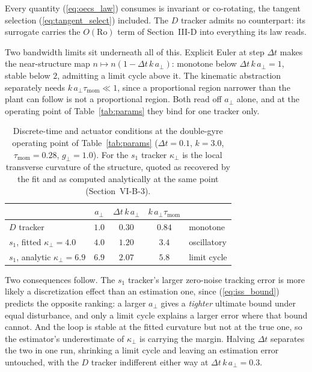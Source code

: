 \documentclass[lettersize,journal]{IEEEtran}
\begin{document}
Every quantity (\ref{eq:oecs_law}) consumes is invariant or co-rotating,
the tangent selection (\ref{eq:tangent_select}) included. The $D$
tracker admits no counterpart: its surrogate carries the
$O(\mathrm{Ro})$ term of Section~\mbox{III-D} into everything its law
reads.

Two bandwidth limits sit underneath all of this. Explicit Euler at step
$\Delta t$ makes the near-structure map $n \mapsto n(1 - \Delta t\,k\,
a_\perp)$: monotone below $\Delta t\,k\,a_\perp = 1$, stable below $2$,
admitting a limit cycle above it. The kinematic abstraction separately
needs $k\,a_\perp\tau_{\mathrm{mom}} \ll 1$, since a proportional region
narrower than the plant can follow is not a proportional region. Both
read off $a_\perp$ alone, and at the operating point of
Table~\ref{tab:params} they bind for one tracker only.

\begin{table}[!t]
\centering
\caption{Discrete-time and actuator conditions at the double-gyre
operating point of Table~\ref{tab:params} ($\Delta t = 0.1$, $k = 3.0$,
$\tau_{\mathrm{mom}} = 0.28$, $g_\perp = 1.0$). For the $s_1$ tracker
$\kappa_\perp$ is the local transverse curvature of the structure,
quoted as recovered by the fit and as computed analytically at the same
point (Section~\mbox{VI-B-3}).}
\label{tab:bandwidth}
\footnotesize
\setlength{\tabcolsep}{4pt}
\begin{tabular}{@{}lcccl@{}}
\hline
 & $a_\perp$ & $\Delta t\,k\,a_\perp$ &
 $k\,a_\perp\tau_{\mathrm{mom}}$ & \\
\hline
$D$ tracker & $1.0$ & $0.30$ & $0.84$ & monotone \\
$s_1$, fitted $\kappa_\perp = 4.0$ & $4.0$ & $1.20$ & $3.4$ & oscillatory \\
$s_1$, analytic $\kappa_\perp = 6.9$ & $6.9$ & $2.07$ & $5.8$ & limit cycle \\
\hline
\end{tabular}
\end{table}

Two consequences follow. The $s_1$ tracker's larger zero-noise tracking
error is more likely a discretization effect than an estimation one,
since (\ref{eq:iss_bound}) predicts the opposite ranking: a larger
$a_\perp$ gives a \emph{tighter} ultimate bound under equal disturbance,
and only a limit cycle explains a larger error where that bound cannot.
And the loop is stable at the fitted curvature but not at the true one,
so the estimator's underestimate of $\kappa_\perp$ is carrying the
margin. Halving $\Delta t$ separates the two in one run, shrinking a
limit cycle and leaving an estimation error untouched, with the $D$
tracker indifferent either way at $\Delta t\,k\,a_\perp = 0.3$.
\end{document}
